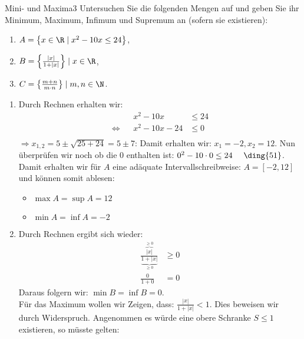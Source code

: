 \begin{aufgabe}{Mini- und Maxima}{3}
    Untersuchen Sie die folgenden Mengen auf  und geben Sie ihr Minimum, Maximum, Infimum und Supremum an (sofern sie existieren):
    \begin{multicols}{2}
        \begin{enumerate}[label=\textbf{\Alph*:} ]
            \item \(A = \left\{x \in \R \mid x^2 - 10x \leq 24\right\}\),
            \item \(B = \left\{\frac{|x|}{1 + |x|}\right\} \mid x \in \R\),
            \item \(C = \left\{\frac{m+n}{m \cdot n}\right\} \mid m,n \in \N\).
        \end{enumerate}
    \end{multicols}\vspace{-1\baselineskip}
\Splitter\nskip
\begin{enumerate}[label=\textbf{\Alph*:} ]
    \item Durch Rechnen erhalten wir: \begin{alignat*}{2}
        && x^{2} - 10x &\leq 24 \\
        \Leftrightarrow && x^2 - 10x - 24 &\leq 0 \\
    \end{alignat*}
    $\Rightarrow x_{1,2} = 5 \pm \sqrt{25 + 24} = 5 \pm 7$: \newline
    Damit erhalten wir: $x_1 = -2, x_2 = 12$. Nun überprüfen wir noch ob die $0$ enthalten ist: $0^2 - 10 \cdot 0 \leq 24 \quad \text{ \ding{51}}$. Damit erhalten wir für $A$ eine adäquate Intervallschreibweise: $A = [-2, 12]$ und können somit ablesen: \begin{itemize}[label=$\diamond$]
        \item $\max A = \sup A = 12$
        \item $\min A = \inf A = -2$
    \end{itemize}
    \item Durch Rechnen ergibt sich wieder: \begin{align*}
        \frac{\overbrace{|x|}^{\geq 0}}{\underbrace{1 + |x|}_{\geq 0}} &\geq 0 \\
        \frac{0}{1 + 0} &= 0
    \end{align*}
    Daraus folgern wir: $\min B = \inf B = 0$. \\
    Für das Maximum wollen wir Zeigen, dass: $\frac{|x|}{1 + |x|} < 1$. Dies beweisen wir durch Widerspruch. Angenommen es würde eine obere Schranke $S \leq 1$ existieren, so müsste gelten: \begin{alignat*}{3}

\end{alignat*}
\end{enumerate}
\end{aufgabe}

